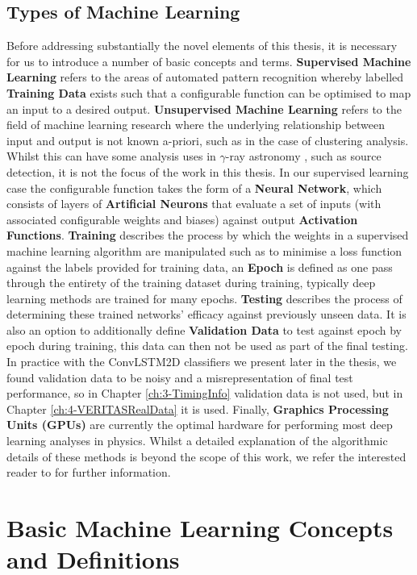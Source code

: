 \subsection{Types of Machine Learning}
Before addressing substantially the novel elements of this thesis, it is necessary for us to introduce a number of basic concepts and terms. \textbf{Supervised Machine Learning} refers to the areas of automated pattern recognition whereby labelled \textbf{Training Data} exists such that a configurable function can be optimised to map an input to a desired output. \textbf{Unsupervised Machine Learning} refers to the field of machine learning research where the underlying relationship between input and output is not known a-priori, such as in the case of clustering analysis. Whilst this can have some analysis uses in $\gamma$-ray astronomy \cite{tomthesis}, such as source detection, it is not the focus of the work in this thesis. In our supervised learning case the configurable function takes the form of a \textbf{Neural Network}, which consists of layers of \textbf{Artificial Neurons} that evaluate a set of inputs (with associated configurable weights and biases) against output \textbf{Activation Functions}. \textbf{Training} describes the process by which the weights in a supervised machine learning algorithm are manipulated such as to minimise a loss function against the labels provided for training data, an \textbf{Epoch} is defined as one pass through the entirety of the training dataset during training, typically deep learning methods are trained for many epochs. \textbf{Testing} describes the process of determining these trained networks' efficacy against previously unseen data. It is also an option to additionally define \textbf{Validation Data} to test against epoch by epoch during training, this data can then not be used as part of the final testing. In practice with the ConvLSTM2D classifiers we present later in the thesis, we found validation data to be noisy and a misrepresentation of final test performance, so in Chapter \ref{ch:3-TimingInfo} validation data is not used, but in Chapter \ref{ch:4-VERITASRealData} it is used. Finally, \textbf{Graphics Processing Units (GPUs)} are currently the optimal hardware for performing most deep learning analyses in physics. Whilst a detailed explanation of the algorithmic details of these methods is beyond the scope of this work, we refer the interested reader to \cite{goodfellow2016deep} \cite{erdmannwhite} \cite{dcnn} for further information.

\section{Basic Machine Learning Concepts and Definitions}

